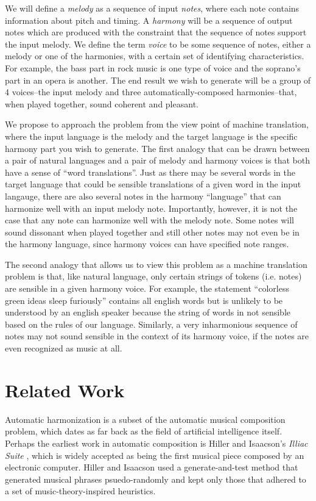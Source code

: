 \documentclass{sig-alternate}
\begin{document}
We will define a \textit{melody} as a sequence of input \textit{notes}, where each note contains information
about pitch and timing. A \textit{harmony} will be a sequence of output notes which are produced with
the constraint that the sequence of notes support the input melody. We define the term \textit{voice}
to be some sequence of notes, either a melody or one of the harmonies, with a certain set of identifying 
characteristics. For example, the bass part in rock music is one type of voice and the soprano's part in an 
opera is another. The end result we wish to generate will be a group of 4 voices--the input melody and 
three automatically-composed harmonies--that, when played together, sound coherent and pleasant.

We propose to approach the problem from the view point of machine translation, where the input language
is the melody and the target language is the specific harmony part you wish to generate. The first analogy
that can be drawn between a pair of natural languages and a pair of melody and harmony voices is that both
have a sense of ``word translations''. Just as there may be several words in the target language that could
be sensible translations of a given word in the input langauge, there are also several notes in the harmony 
``language'' that can harmonize well with an input melody note. Importantly, however, it is not the case that
any note can harmonize well with the melody note. Some notes will sound dissonant when played together 
and still other notes may not even be in the harmony language, since harmony voices can have specified note
ranges. 

The second analogy that allows us to view this problem as a machine translation problem is that, like 
natural language, only certain strings of tokens (i.e. notes) are sensible in a given harmony voice. For example,
the statement ``colorless green ideas sleep furiously'' contains all english words but is unlikely to
be understood by an english speaker because the string of words in not sensible based on the rules of our
language. Similarly, a very inharmonious sequence of notes may not sound sensible in the context of its
harmony voice, if the notes are even recognized as music at all.

\section{Related Work}
\label{sec:related_work}
Automatic harmonization is a subset of the automatic musical composition problem,
which dates as far back as the field of artificial intelligence itself. Perhaps
the earliest work in automatic composition is Hiller and Isaacson's
\textit{Illiac Suite} \cite{hiller1959experimental}, which is widely accepted as being the first
musical piece composed by an electronic computer. Hiller and Isaacson
used a generate-and-test method that generated musical phrases psuedo-randomly and 
kept only those that adhered to a set of music-theory-inspired heuristics. 
\end{document}
